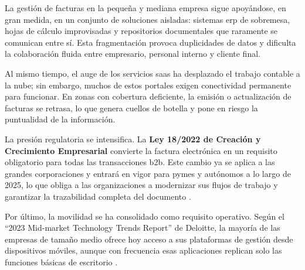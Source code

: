 \begin{large}
La gestión de facturas en la pequeña y mediana empresa sigue apoyándose, en gran medida, en un conjunto de soluciones aisladas: sistemas \gls{erp} de sobremesa, hojas de cálculo improvisadas y repositorios documentales que raramente se comunican entre sí. Esta fragmentación provoca duplicidades de datos y dificulta la colaboración fluida entre empresario, personal interno y cliente final.

Al mismo tiempo, el auge de los servicios \gls{saas} ha desplazado el trabajo contable a la nube; sin embargo, muchos de estos portales exigen conectividad permanente para funcionar. En zonas con cobertura deficiente, la emisión o actualización de facturas se retrasa, lo que genera cuellos de botella y pone en riesgo la puntualidad de la información.

La presión regulatoria se intensifica. La \textbf{Ley 18/2022 de Creación y Crecimiento Empresarial} convierte la factura electrónica en un requisito obligatorio para todas las transacciones \gls{b2b}. Este cambio ya se aplica a las grandes corporaciones y entrará en vigor para pymes y autónomos a lo largo de 2025, lo que obliga a las organizaciones a modernizar sus flujos de trabajo y garantizar la trazabilidad completa del documento \cite{ley18_2022}.

Por último, la movilidad se ha consolidado como requisito operativo. Según el “2023 Mid-market Technology Trends Report” de Deloitte, la mayoría de las empresas de tamaño medio ofrece hoy acceso a sus plataformas de gestión desde dispositivos móviles, aunque con frecuencia esas aplicaciones replican solo las funciones básicas de escritorio \cite{estudio_movilidad}.
\end{large}

